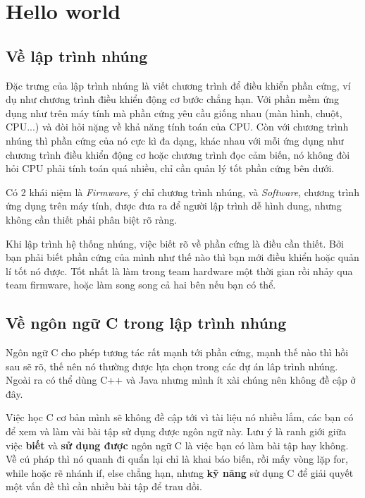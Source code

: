 \chapter{Hello world}
\newpage

\section{Về lập trình nhúng}
    
Đặc trưng của lập trình nhúng là viết chương trình để điều khiển phần cứng, ví dụ như chương trình điều khiển động cơ bước chẳng hạn. Với phần mềm ứng dụng như trên máy tính mà phần cứng yêu cầu giống nhau (màn hình, chuột, CPU...) và đòi hỏi nặng về khả năng tính toán của CPU. Còn với chương trình nhúng thì phần cứng của nó cực kì đa dạng, khác nhau với mỗi ứng dụng như chương trình điều khiển động cơ hoặc chương trình đọc cảm biến, nó không đòi hỏi CPU phải tính toán quá nhiều, chỉ cần quản lý tốt phần cứng bên dưới. 
    
Có 2 khái niệm là \textit{Firmware}, ý chỉ chương trình nhúng, và \textit{Software}, chương trình ứng dụng trên máy tính, được đưa ra để người lập trình dễ hình dung, nhưng không cần thiết phải phân biệt rõ ràng.
    
Khi lập trình hệ thống nhúng, việc biết rõ về phần cứng là điều cần thiết. Bởi bạn phải biết phần cứng của mình như thế nào thì bạn mới điều khiển hoặc quản lí tốt nó được. Tốt nhất là làm trong team hardware một thời gian rồi nhảy qua team firmware, hoặc làm song song cả hai bên nếu bạn có thể.

\section{Về ngôn ngữ C trong lập trình nhúng}
    
Ngôn ngữ C cho phép tương tác rất mạnh tới phần cứng, mạnh thế nào thì hồi sau sẽ rõ, thế nên nó thường được lựa chọn trong các dự án lâp trình nhúng. Ngoài ra có thể dùng C++ và Java nhưng mình ít xài chúng nên không đề cập ở đây.
    
Việc học C cơ bản mình sẽ không đề cập tới vì tài liệu nó nhiều lắm, các bạn có để xem và làm vài bài tập sử dụng được ngôn ngữ này. Lưu ý là ranh giới giữa việc \textbf{biết} và \textbf{sử dụng được} ngôn ngữ C là việc bạn có làm bài tập hay không. Về cú pháp thì nó quanh đi quẩn lại chỉ là khai báo biến, rồi mấy vòng lặp for, while hoặc rẽ nhánh if, else chẳng hạn, nhưng \textbf{kỹ năng} sử dụng C để giải quyết một vấn đề thì cần nhiều bài tập để trau dồi.
    
